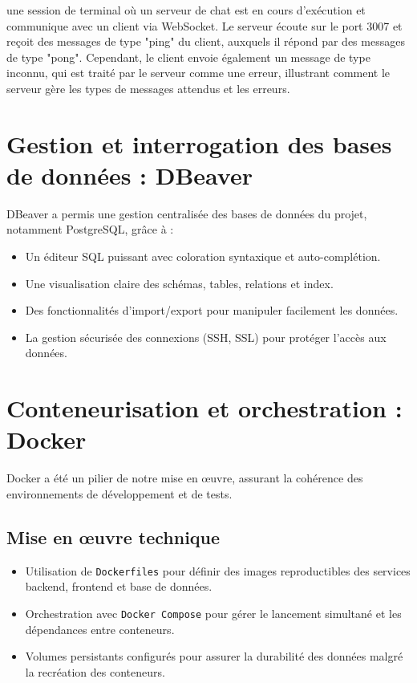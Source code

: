 \documentclass{rapportPfe}
\begin{document}
une session de terminal où un serveur de chat est en cours d'exécution et communique avec un client via WebSocket. Le serveur écoute sur le port 3007 et reçoit des messages de type "ping" du client, auxquels il répond par des messages de type "pong". Cependant, le client envoie également un message de type inconnu, qui est traité par le serveur comme une erreur, illustrant comment le serveur gère les types de messages attendus et les erreurs.

\section{Gestion et interrogation des bases de données : DBeaver}

DBeaver a permis une gestion centralisée des bases de données du projet, notamment PostgreSQL, grâce à :

\begin{itemize}
    \item Un éditeur SQL puissant avec coloration syntaxique et auto-complétion.
    \item Une visualisation claire des schémas, tables, relations et index.
    \item Des fonctionnalités d’import/export pour manipuler facilement les données.
    \item La gestion sécurisée des connexions (SSH, SSL) pour protéger l’accès aux données.
\end{itemize}

\section{Conteneurisation et orchestration : Docker}

Docker a été un pilier de notre mise en œuvre, assurant la cohérence des environnements de développement et de tests.

\subsection{Mise en œuvre technique}

\begin{itemize}
    \item Utilisation de \texttt{Dockerfiles} pour définir des images reproductibles des services backend, frontend et base de données.
    \item Orchestration avec \texttt{Docker Compose} pour gérer le lancement simultané et les dépendances entre conteneurs.
    \item Volumes persistants configurés pour assurer la durabilité des données malgré la recréation des conteneurs.
\end{itemize}
\end{document}
